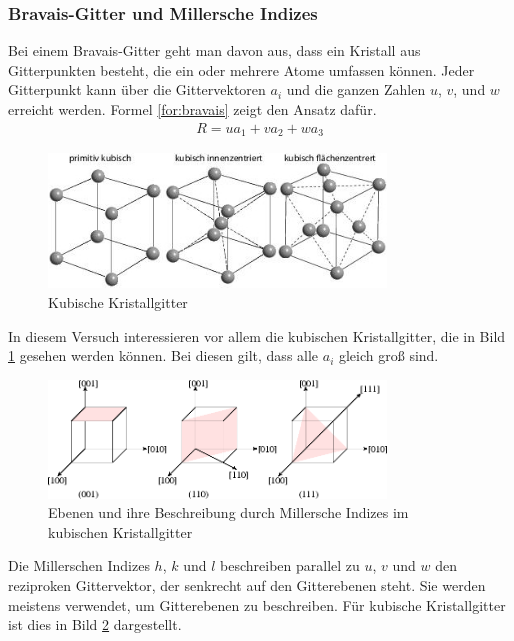 \documentclass[german, %
parskip=full, %
bibliography=totoc, %
]{scrartcl}
\begin{document}
\subsubsection{Bravais-Gitter und Millersche Indizes}

Bei einem Bravais-Gitter geht man davon aus, dass ein Kristall aus Gitterpunkten besteht, die ein oder mehrere Atome umfassen können. Jeder Gitterpunkt kann über die Gittervektoren $a_i$ und die ganzen Zahlen $u$, $v$, und $w$ erreicht werden. Formel \ref{for:bravais} zeigt den Ansatz dafür.
\begin{align}
R = ua_1 + va_2 + wa_3 \label{for:bravais}
\end{align}

\begin{figure}[ht] 
  \centering
     \includegraphics[width=0.8\textwidth]{KubischeGitter}
  \caption{Kubische Kristallgitter \cite{kubisch}}
  \label{fig:gitter}
\end{figure}

In diesem Versuch interessieren vor allem die kubischen Kristallgitter, die in Bild \ref{fig:gitter} gesehen werden können. Bei diesen gilt, dass alle $a_i$ gleich groß sind. 

\begin{figure}[ht] 
  \centering
     \includegraphics[width=0.8\textwidth]{Miller}
  \caption{Ebenen und ihre Beschreibung durch Millersche Indizes im kubischen Kristallgitter \cite{miller}}
  \label{fig:miller}
\end{figure}

Die Millerschen Indizes $h$, $k$ und $l$ beschreiben parallel zu $u$, $v$ und $w$ den reziproken Gittervektor, der senkrecht auf den Gitterebenen steht. Sie werden meistens verwendet, um Gitterebenen zu beschreiben. Für kubische Kristallgitter ist dies in Bild \ref{fig:miller} dargestellt.
\end{document}

